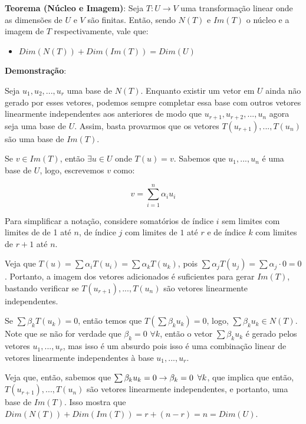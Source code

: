 \documentclass[11pt, a4paper]{article}
\begin{document}
\textbf{Teorema (Núcleo e Imagem)}: Seja \(T:U\rightarrow V\) uma transformação linear onde as dimensões de \(U\) e \(V\) são finitas. Então, sendo \(N(T)\) e \(Im(T)\) o núcleo e a imagem de \(T\) respectivamente, vale que:

\begin{itemize}
    \item \(Dim(N(T))+Dim(Im(T))=Dim(U)\)
\end{itemize}

\textbf{Demonstração}:

Seja \(u_1,u_2,...,u_r\) uma base de \(N(T)\). Enquanto existir um vetor em \(U\) ainda não gerado por esses vetores, podemos sempre completar essa base com outros vetores linearmente independentes aos anteriores de modo que \(u_{r+1},u_{r+2},...,u_n\) agora seja uma base de \(U\). Assim, basta provarmos que os vetores \(T(u_{r+1}),...,T(u_n)\) são uma base de \(Im(T)\).

Se \(v \in Im(T)\), então \(\exists u \in U\) onde \(T(u)=v\). Sabemos que \(u_1,...,u_n\) é uma base de \(U\), logo, escrevemos \(v\) como:

\void[-2.4]

\[v=\sum_{i=1}^{n}\alpha_iu_i{}\]

\void[-0.5]

Para simplificar a notação, considere somatórios de índice \(i\) sem limites com limites de de 1 até \(n\), de índice \(j\) com limites de \(1\) até \(r\) e de índice \(k\) com limites de \(r+1\) até \(n\).

Veja que \(T(u)=\sum{\alpha_iT(u_i)}=\sum{\alpha_kT(u_k)}\), pois \(\sum \alpha_jT(u_j)=\sum{\alpha_j\cdot 0=0}\). Portanto, a imagem dos vetores adicionados é suficientes para gerar \(Im(T)\), bastando verificar se \(T(u_{r+1}),...,T(u_n)\) são vetores linearmente independentes.

Se \(\sum\beta_kT(u_k)=0\), então temos que \(T(\sum{\beta_ku_k})=0\), logo, \(\sum{\beta_ku_k} \in N(T)\). Note que se não for verdade que \(\beta_k=0\) \(\forall k\), então o vetor \(\sum{\beta_ku_k}\) é gerado pelos vetores \(u_1,...,u_r\), mas isso é um absurdo pois isso é uma combinação linear de vetores linearmente independentes à base \(u_1,...,u_r\). 

Veja que, então, sabemos que \(\sum{\beta_ku_k}=0 \rightarrow \beta_k=0 \tb[0.5] \forall k\), que implica que então, \(T(u_{r+1}),...,T(u_n)\) são vetores linearmente independentes, e portanto, uma base de \(Im(T)\). Isso mostra que \(Dim(N(T))+Dim(Im(T))=r+(n-r)=n=Dim(U)\).
\end{document}
